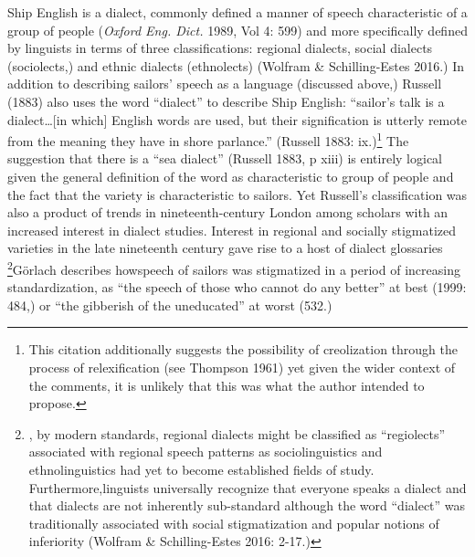 \begin{styleStandard}
Ship English is a dialect, commonly defined a manner of speech characteristic of a group of people (\textit{Oxford Eng. Dict. }1989, Vol 4: 599) and more specifically defined by linguists in terms of three classifications: regional dialects, social dialects (sociolects,) and ethnic dialects (ethnolects) (Wolfram \& Schilling-Estes 2016.) In addition to describing sailors’ speech as a language (discussed above,) Russell (1883) also uses the word “dialect” to describe Ship English: “sailor’s talk is a dialect…[in which] English words are used, but their signification is utterly remote from the meaning they have in shore parlance.” (Russell 1883: ix.)\footnote{ This citation additionally suggests the possibility of creolization through the process of relexification (see Thompson 1961) yet given the wider context of the comments, it is unlikely that this was what the author intended to propose. } The suggestion that there is a “sea dialect” (Russell 1883, p xiii) is entirely logical given the general definition of the word as characteristic to group of people and the fact that the variety is characteristic to sailors. Yet Russell’s classification was also a product of trends in nineteenth-century London among scholars with an increased interest in dialect studies. Interest in regional and socially stigmatized varieties in the late nineteenth century gave rise to a host of dialect glossaries \footnote{ , by modern standards, regional dialects might be classified as “regiolects”  associated with regional speech patterns as sociolinguistics and ethnolinguistics had yet to become established fields of study. Furthermore,linguists universally recognize that everyone speaks a dialect and that dialects are not inherently sub-standard although the word “dialect” was traditionally associated with social stigmatization and popular notions of inferiority (Wolfram \& Schilling-Estes 2016: 2-17.) }\textstylereferencetext{ }Görlach describes howspeech of sailors was stigmatized in a period of increasing standardization, as “the speech of those who cannot do any better” at best (1999: 484,) or “the gibberish of the uneducated” at worst (532.)
\end{styleStandard}

